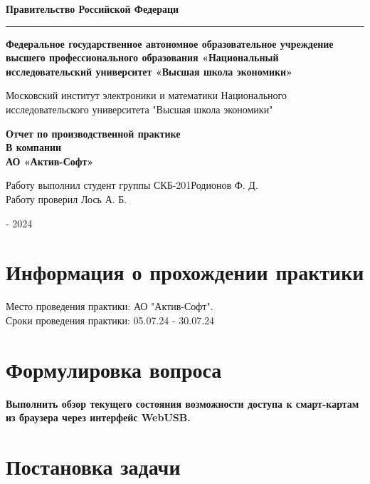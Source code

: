 \documentclass[12pt]{article}
\begin{document}
\thispagestyle{empty}

\begin{center}
    \large\textbf{Правительство Российской Федераци}
    \rule{\textwidth}{1pt}
\end{center}

\begin{center}
    \large\textbf{Федеральное государственное автономное образовательное учреждение высшего профессионального образования «Национальный исследовательский университет «Высшая школа экономики»}
\end{center}
\begin{center}
    Московский институт электроники и математики Национального исследовательского университета "Высшая школа экономики"
\end{center}
\vfill
\begin{center}
    \Huge\textbf{Отчет по производственной практике\\
    В компании\\ 
    АО «Актив-Софт»}
\end{center}
\vfill
Работу выполнил студент группы СКБ-201\hfill \hfill Родионов Ф. Д.\\
Работу проверил \hfill \hfill Лось А. Б.\\

\begin{center}
     - 2024
\end{center}

\newpage


\markboth{\theauthor}{\thetitle}


\section{Информация о прохождении практики}
Место проведения практики: АО "Актив-Софт". \\ 
Сроки проведения практики: 05.07.24 - 30.07.24 \\

\section{Формулировка вопроса}

\textbf{Выполнить обзор текущего состояния возможности доступа к смарт-картам из браузера через интерфейс WebUSB.}

\section{Постановка задачи}
\end{document}
